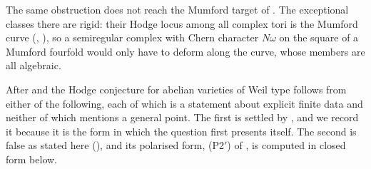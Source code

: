 \begin{remark}
The same obstruction does not reach the Mumford target of
. The exceptional classes there are rigid: their Hodge
locus among all complex tori is the Mumford curve (,
), so a semiregular complex with Chern character
$N\omega$ on the square of a Mumford fourfold would only have to deform along
the curve, whose members are all algebraic.
\end{remark}

\begin{remark}
\label{rem:tworemain}
After  and  the Hodge
conjecture for abelian varieties of Weil type follows from either of the
following, each of which is a statement about explicit finite data and neither
of which mentions a general point. The first is settled by
, and we record it because it is the form in which the
question first presents itself. The second is false as stated here
(), and its polarised form, \textup{(P2$'$)} of
, is computed in closed form below.


\end{remark}
